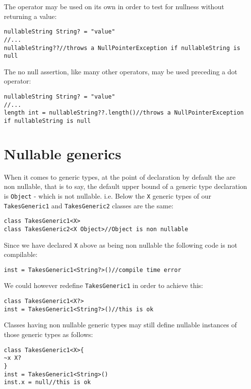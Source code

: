 \documentclass[conc-doc]{subfiles}
\begin{document}
The operator may be used on its own in order to test for nullness without returning a value:

\begin{lstlisting}
nullableString String? = "value"
//...
nullableString??//throws a NullPointerException if nullableString is null
\end{lstlisting}

The no null assertion, like many other operators, may be used preceding a dot operator:

\begin{lstlisting}
nullableString String? = "value"
//...
length int = nullableString??.length()//throws a NullPointerException if nullableString is null
\end{lstlisting}

\section{Nullable generics}
When it comes to generic types, at the point of declaration by default the are non nullable, that is to say, the default upper bound of a generic type declaration is \lstinline{Object} - which is not nullable. i.e. Below the \lstinline{X} generic types of our \lstinline{TakesGeneric1} and \lstinline{TakesGeneric2} classes are the same:
\begin{lstlisting}
class TakesGeneric1<X>
class TakesGeneric2<X Object>//Object is non nullable
\end{lstlisting}

Since we have declared \lstinline{X} above as being non nullable the following code is not compilable:
\begin{lstlisting}
inst = TakesGeneric1<String?>()//compile time error
\end{lstlisting}

We could however redefine \lstinline{TakesGeneric1} in order to achieve this:

\begin{lstlisting}
class TakesGeneric1<X?>
inst = TakesGeneric1<String?>()//this is ok
\end{lstlisting}

Classes having non nullable generic types may still define nullable instances of those generic types as follows:

\begin{lstlisting}
class TakesGeneric1<X>{
~x X?
}
inst = TakesGeneric1<String>()
inst.x = null//this is ok
\end{lstlisting}
\end{document}
